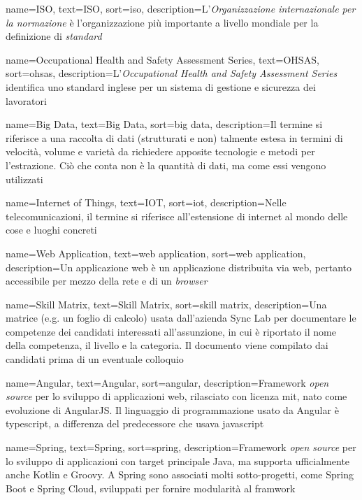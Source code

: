{
    name=ISO,
    text=ISO,
    sort=iso,
    description={L'\emph{Organizzazione internazionale per la normazione} è l'organizzazione più importante a livello mondiale per la definizione di \textit{standard}}
}

{
    name=Occupational Health and Safety Assessment Series,
    text=OHSAS,
    sort=ohsas,
    description={L'\emph{Occupational Health and Safety Assessment Series} identifica uno standard inglese per un sistema di gestione e sicurezza dei lavoratori}
}

{
    name=Big Data,
    text=Big Data,
    sort=big data,
    description={Il termine si riferisce a una raccolta di dati (strutturati e non) talmente estesa in termini di velocità, volume e varietà da richiedere apposite tecnologie e metodi per l'estrazione. Ciò che conta non è la quantità di dati, ma come essi vengono utilizzati}
}

{
    name=Internet of Things,
    text=IOT,
    sort=iot,
    description={Nelle telecomunicazioni, il termine si riferisce all'estensione di internet al mondo delle cose e luoghi concreti}
}

{
    name=Web Application,
    text=web application,
    sort=web application,
    description={Un applicazione web è un applicazione distribuita via web, pertanto accessibile per mezzo della rete e di un \emph{browser}}
}

{
    name=Skill Matrix,
    text=Skill Matrix,
    sort=skill matrix,
    description={Una matrice (e.g. un foglio di calcolo) usata dall'azienda Sync Lab per documentare le competenze dei candidati interessati all'assunzione, in cui è riportato il nome della competenza, il livello e la categoria. Il documento viene compilato dai candidati prima di un eventuale colloquio}
}

{
    name=Angular,
    text=Angular,
    sort=angular,
    description={Framework \textit{open source} per lo sviluppo di applicazioni web, rilasciato con licenza \gls{mit}, nato come evoluzione di AngularJS. Il linguaggio di programmazione usato da Angular è \gls{typescript}, a differenza del predecessore che usava \gls{javascript}}
}

{
    name=Spring,
    text=Spring,
    sort=spring,
    description={Framework \textit{open source} per lo sviluppo di applicazioni con target principale Java, ma supporta ufficialmente anche Kotlin e Groovy. A Spring sono associati molti sotto-progetti, come Spring Boot e Spring Cloud, sviluppati per fornire modularità al framwork}
}

